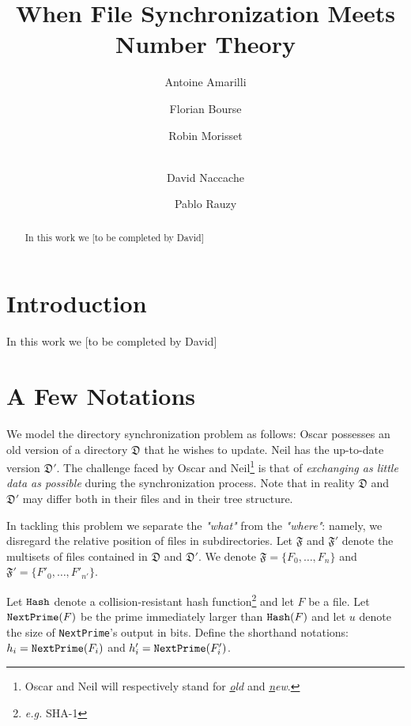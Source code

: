 \documentclass[11pt]{llncs}
\begin{document}
\title{When File Synchronization Meets Number Theory}

\author{Antoine Amarilli \and Florian Bourse \and Robin Morisset \and\\
David Naccache \and Pablo Rauzy}
\institute{}

\maketitle

\begin{abstract}

In this work we [to be completed by David]

\end{abstract}

\section{Introduction}

In this work we [to be completed by David]

\section{A Few Notations}

We model the directory synchronization problem as follows: Oscar possesses an old version of a directory $\mathfrak{D}$ that he wishes to update. Neil has the up-to-date version $\mathfrak{D}'$. The challenge faced by Oscar and Neil\footnote{Oscar and Neil will respectively stand for {\sl \underline{o}ld} and {\sl \underline{n}ew}.} is that of {\sl exchanging as little data as possible} during the synchronization process. Note that in reality $\mathfrak{D}$ and $\mathfrak{D}'$ may differ both in their files and in their tree structure.\smallskip

In tackling this problem we separate the {\sl "what"} from the {\sl "where"}: namely, we disregard the relative position of files in subdirectories. Let $\mathfrak{F}$ and $\mathfrak{F}'$ denote the multisets of files contained in $\mathfrak{D}$ and $\mathfrak{D}'$. We denote $\mathfrak{F}=\{F_0,\ldots,F_{n}\}$ and $\mathfrak{F}'=\{F'_0,\ldots,F'_{n'}\}$.\smallskip

Let $\mbox{{\tt Hash}}$ denote a collision-resistant hash function\footnote{{\sl e.g.} SHA-1} and let $F$ be a file. Let $\mbox{{\tt NextPrime}}(F)$ be the prime immediately larger than $\mbox{{\tt Hash}}(F)$ and let $u$ denote the size of {\tt NextPrime}'s output in bits. Define the shorthand notations: $h_i=\mbox{{\tt NextPrime}}(F_i)$ and $h'_i=\mbox{{\tt NextPrime}}(F'_i)$.\smallskip
\end{document}
